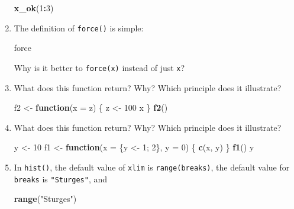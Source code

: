 \documentclass[]{book}
\newenvironment{Shaded}{\begin{snugshade}}{\end{snugshade}}
\newcommand{\ControlFlowTok}[1]{\textcolor[rgb]{0.13,0.29,0.53}{\textbf{#1}}}
\newcommand{\DataTypeTok}[1]{\textcolor[rgb]{0.13,0.29,0.53}{#1}}
\newcommand{\DecValTok}[1]{\textcolor[rgb]{0.00,0.00,0.81}{#1}}
\newcommand{\KeywordTok}[1]{\textcolor[rgb]{0.13,0.29,0.53}{\textbf{#1}}}
\newcommand{\NormalTok}[1]{#1}
\newcommand{\OperatorTok}[1]{\textcolor[rgb]{0.81,0.36,0.00}{\textbf{#1}}}
\newcommand{\StringTok}[1]{\textcolor[rgb]{0.31,0.60,0.02}{#1}}
\theoremstyle{definition}
\theoremstyle{definition}
\theoremstyle{definition}
\theoremstyle{remark}
\begin{document}
\begin{enumerate}
\begin{Shaded}
\begin{Highlighting}[]
\KeywordTok{x_ok}\NormalTok{(}\DecValTok{1}\OperatorTok{:}\DecValTok{3}\NormalTok{)}
\end{Highlighting}
\end{Shaded}
\item
  The definition of \texttt{force()} is simple:

\begin{Shaded}
\begin{Highlighting}[]
\NormalTok{force}
\end{Highlighting}
\end{Shaded}

  Why is it better to \texttt{force(x)} instead of just \texttt{x}?
\item
  What does this function return? Why? Which principle does it
  illustrate?

\begin{Shaded}
\begin{Highlighting}[]
\NormalTok{f2 <-}\StringTok{ }\ControlFlowTok{function}\NormalTok{(}\DataTypeTok{x =}\NormalTok{ z) \{}
\NormalTok{  z <-}\StringTok{ }\DecValTok{100}
\NormalTok{  x}
\NormalTok{\}}
\KeywordTok{f2}\NormalTok{()}
\end{Highlighting}
\end{Shaded}
\item
  What does this function return? Why? Which principle does it
  illustrate?

\begin{Shaded}
\begin{Highlighting}[]
\NormalTok{y <-}\StringTok{ }\DecValTok{10}
\NormalTok{f1 <-}\StringTok{ }\ControlFlowTok{function}\NormalTok{(}\DataTypeTok{x =}\NormalTok{ \{y <-}\StringTok{ }\DecValTok{1}\NormalTok{; }\DecValTok{2}\NormalTok{\}, }\DataTypeTok{y =} \DecValTok{0}\NormalTok{) \{}
  \KeywordTok{c}\NormalTok{(x, y)}
\NormalTok{\}}
\KeywordTok{f1}\NormalTok{()}
\NormalTok{y}
\end{Highlighting}
\end{Shaded}
\item
  In \texttt{hist()}, the default value of \texttt{xlim} is
  \texttt{range(breaks)}, the default value for \texttt{breaks} is
  \texttt{"Sturges"}, and

\begin{Shaded}
\begin{Highlighting}[]
\KeywordTok{range}\NormalTok{(}\StringTok{"Sturges"}\NormalTok{)}
\end{Highlighting}
\end{Shaded}


\end{enumerate}
\end{document}
